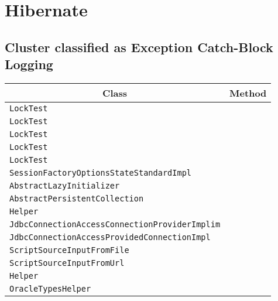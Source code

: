 \section{Hibernate}\label{hibernate}

\subsection{Cluster classified as Exception Catch-Block Logging}

\begin{center}
\begin{tabular}{ll}\toprule
\multicolumn{1}{c}{Class}&\multicolumn{1}{c}{Method}\\\midrule
\lstinline/LockTest/&\raisebox{0pt}{\lstinline/call()/}\\
\lstinline/LockTest/&\raisebox{0pt}{\lstinline/call()/}\\
\lstinline/LockTest/&\raisebox{0pt}{\lstinline/call()/}\\
\lstinline/LockTest/&\raisebox{0pt}{\lstinline/call()/}\\
\lstinline/LockTest/&\raisebox{0pt}{\lstinline/call()/}\\
\lstinline/SessionFactoryOptionsStateStandardImpl/&\raisebox{0pt}{\lstinline/SessionFactoryOptionsStateStandardImpl(StandardServiceRegistry)/}\\
\lstinline/AbstractLazyInitializer/&\raisebox{0pt}{\lstinline/permissiveInitialization()/}\\
\lstinline/AbstractPersistentCollection/&\raisebox{0pt}{\lstinline/twithTemporarySessionIfNeeded(LazyInitializationWork<T>)/}\\
\lstinline/Helper/&\raisebox{0pt}{\lstinline/performWork(LazyInitializationWork<T>)/}\\
\lstinline/JdbcConnectionAccessConnectionProviderImplim/&\raisebox{0pt}{\lstinline/releaseConnection(Connection)/}\\
\lstinline/JdbcConnectionAccessProvidedConnectionImpl/&\raisebox{0pt}{\lstinline/releaseConnection(Connection)/}\\
\lstinline/ScriptSourceInputFromFile/&\raisebox{0pt}{\lstinline/release()/}\\
\lstinline/ScriptSourceInputFromUrl/&\raisebox{0pt}{\lstinline/release()/}\\
\lstinline/Helper/&\raisebox{0pt}{\lstinline/performWork(LazyInitializationWork<T>))/}\\
\lstinline/OracleTypesHelper/&\raisebox{0pt}{\lstinline/OracleTypesHelper()/}\\

\end{tabular}
\end{center}
